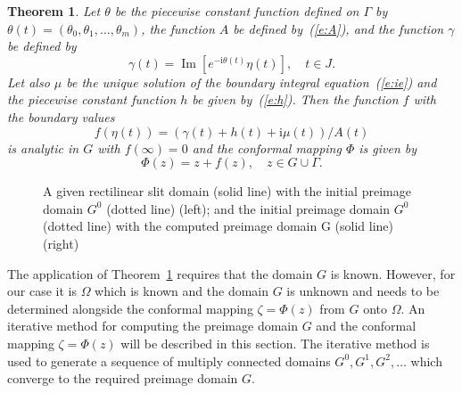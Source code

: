 \documentclass[11pt,a4paper]{article}
\newtheorem{theorem}{Theorem}
\renewcommand{\Im}{\mathop{\mathrm{Im}}}
\renewcommand{\i}{\mathrm{i}}
\renewcommand{\Im}{\mathop{\mathrm{Im}}}
\renewcommand{\i}{\mathrm{i}}
\begin{document}
\begin{theorem}\label{thm:cm-rec-slit}
Let $\theta$ be the piecewise constant function defined on $\Gamma$ by $\theta(t)=(\theta_0,\theta_1,\ldots,\theta_m)$, the function $A$ be defined by~(\ref{e:A}), and the function $\gamma$ be defined by
\begin{equation}
\gamma(t)=\Im\left[e^{-\i\theta(t)}\eta(t)\right], \quad t\in J.
\end{equation}
Let also $\mu$ be the unique solution of the boundary integral equation~(\ref{e:ie}) and the piecewise constant function $h$ be given by~(\ref{e:h}). Then the function $f$ with the boundary values
\begin{equation}\label{eq:f-rec}
f(\eta(t))=(\gamma(t)+h(t)+\i\mu(t))/A(t)
\end{equation}
is analytic in $G$ with $f(\infty)=0$ and the conformal mapping $\Phi$ is 
given by
\begin{equation}
\Phi(z)=z+ f(z), \quad z\in G\cup\Gamma.
\label{eqn:omega-app}
\end{equation}
\end{theorem}

\begin{figure}[ht] %
\centerline{
\hfill
{}
}
\caption{A given rectilinear slit domain (solid line) with the initial preimage domain $G^0$ (dotted line) (left); and the initial preimage domain $G^0$ (dotted  line) with the computed preimage domain G (solid line) (right)} 
\label{f:str}
\end{figure}

The application of Theorem~\ref{thm:cm-rec-slit} requires that the domain $G$ is known. However, for our case it is $\Omega$ which is known and the domain $G$ is unknown and needs to be determined alongside the conformal mapping  $\zeta=\Phi(z)$ from $G$ onto $\Omega$. An iterative method for computing the preimage domain $G$ and the conformal mapping $\zeta=\Phi(z)$ will be described in this section. 
The iterative method is used to generate a sequence of multiply connected domains $G^0,G^1,G^2,\ldots$ which converge to the required preimage domain $G$. 
\end{document}
